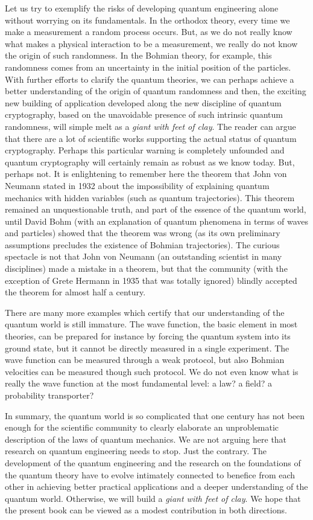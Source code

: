 \documentclass[nofootinbib, secnumarabic, amsmath, nobibnotes,11pt,aps,pra, floatfix]{revtex4-1}
\begin{document}
Let us try to exemplify the risks of developing quantum engineering alone without worrying on its fundamentals. In the orthodox theory, every time we make a measurement a random process occurs. But, as we do not really know what makes a physical interaction to be a measurement, we really do not know the origin of such randomness. In the Bohmian theory, for example, this randomness comes from an uncertainty in the initial position of the particles. With further efforts to clarify the quantum theories, we can perhaps achieve a better understanding of the origin of quantum randomness and then, the exciting new building of application developed along the new discipline of quantum cryptography, based on the unavoidable presence of such intrinsic quantum randomness, will simple melt as a \emph{giant with feet of clay}. The reader can argue that there are a lot of scientific works supporting the actual status of quantum cryptography. Perhaps this particular warning is completely unfounded and quantum cryptography will certainly remain as robust as we know today. But, perhaps not. It is enlightening to remember here the theorem that John von Neumann stated in 1932 about the impossibility of explaining quantum mechanics with hidden variables (such as quantum trajectories). This theorem remained an unquestionable truth, and part of the essence of the quantum world, until David Bohm (with an explanation of quantum phenomena in terms of waves and particles) showed that the theorem was wrong (as its own preliminary assumptions precludes the existence of Bohmian trajectories). The curious spectacle is not that John von Neumann (an outstanding scientist in many disciplines) made a mistake in a theorem, but that the community (with the exception of Grete Hermann in 1935 that was totally ignored) blindly accepted the theorem for almost half a century.

There are many more examples which certify that our understanding of the quantum world is still immature. The wave function, the basic element in most theories, can be prepared for instance by forcing the quantum system into its ground state, but it cannot be directly measured in a single experiment. The wave function can be measured through a weak protocol, but also Bohmian velocities can be measured though such protocol. We do not even know what is really the wave function at the most fundamental level: a law? a field? a probability transporter? 

In summary, the quantum world is so complicated that one century has not been enough for the scientific community to clearly elaborate an unproblematic description of the laws of quantum mechanics. We are not arguing here that research on quantum engineering needs to stop. Just the contrary. The development of the quantum engineering and the research on the foundations of the quantum theory have to evolve intimately connected to benefice from each other in achieving better practical applications and a deeper understanding of the quantum world. Otherwise, we will build a \emph{giant with feet of clay}. We hope that the present book can be viewed as a modest contribution in both directions.
\end{document}
